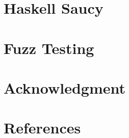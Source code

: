 \documentclass[conference]{IEEEtran}
\begin{document}
%
%
%
%
%
%
%

\section{Haskell Saucy}


\section{Fuzz Testing}


%

\section*{Acknowledgment}

\section*{References}

\appendix


\pagebreak
\end{document}
